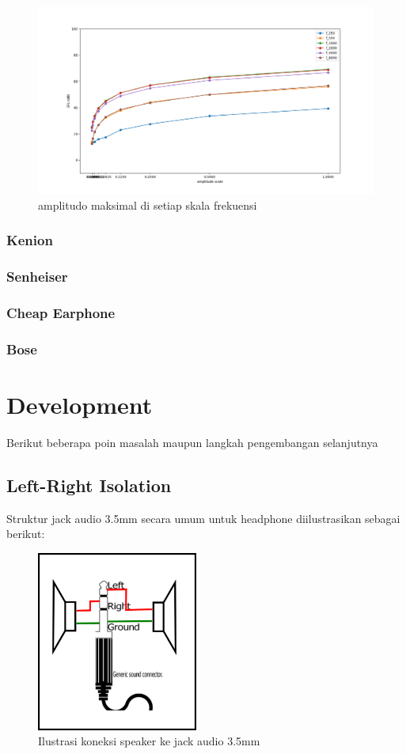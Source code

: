 \documentclass[12pt,]{article}
\begin{document}
	\begin{figure}[!ht]
		\centering
		\includegraphics[width=400pt]{hasil/miniso/allfreq/each_freq}
		\caption{amplitudo maksimal di setiap skala frekuensi}
	\end{figure}

	\subsubsection{Kenion}
	\subsubsection{Senheiser}
	\subsubsection{Cheap Earphone}
	\subsubsection{Bose}

	\newpage
	\section{Development}
	
	Berikut beberapa poin masalah maupun langkah pengembangan selanjutnya
	
	\subsection{Left-Right Isolation}
	
	Struktur jack audio 3.5mm secara umum untuk headphone diilustrasikan sebagai berikut:
	
	\begin{figure}[!ht]
		\centering
		\includegraphics[width=150pt]{images/ohmhp}
		\caption{Ilustrasi koneksi speaker ke jack audio 3.5mm}
	\end{figure}
\end{document}
